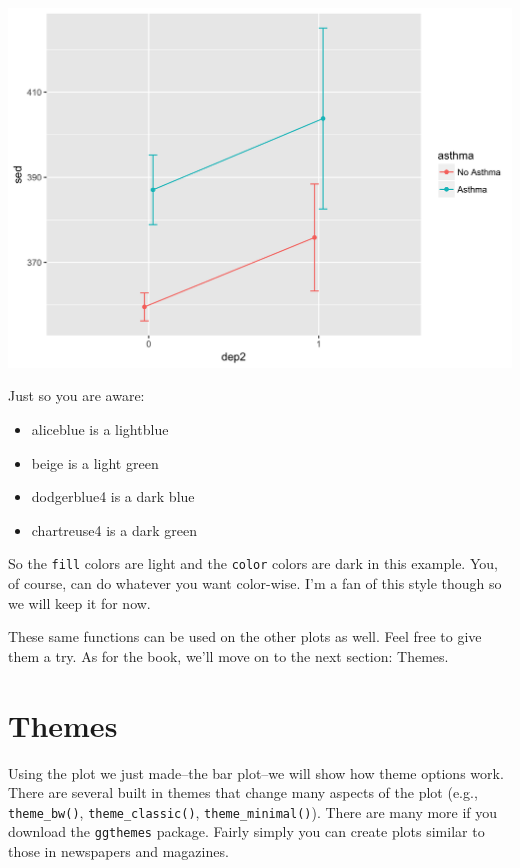\documentclass[]{tufte-book}
\providecommand{\tightlist}{%
  \setlength{\itemsep}{0pt}\setlength{\parskip}{0pt}}
\theoremstyle{definition}
\theoremstyle{definition}
\theoremstyle{remark}
\begin{document}
\includegraphics{_main_files/figure-latex/unnamed-chunk-143-1}

Just so you are aware:

\begin{itemize}
\tightlist
\item
  aliceblue is a lightblue
\item
  beige is a light green
\item
  dodgerblue4 is a dark blue
\item
  chartreuse4 is a dark green
\end{itemize}

So the \texttt{fill} colors are light and the \texttt{color} colors are
dark in this example. You, of course, can do whatever you want
color-wise. I'm a fan of this style though so we will keep it for now.

These same functions can be used on the other plots as well. Feel free
to give them a try. As for the book, we'll move on to the next section:
Themes.

\section*{Themes}\label{themes}

Using the plot we just made--the bar plot--we will show how theme
options work. There are several built in themes that change many aspects
of the plot (e.g., \texttt{theme\_bw()}, \texttt{theme\_classic()},
\texttt{theme\_minimal()}). There are many more if you download the
\texttt{ggthemes} package. Fairly simply you can create plots similar to
those in newspapers and magazines.
\end{document}
